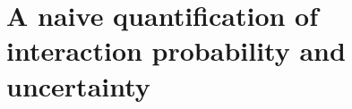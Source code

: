 \documentclass[12pt]{article}
\begin{document}



\section*{A naive quantification of interaction probability and uncertainty}

\end{document}
